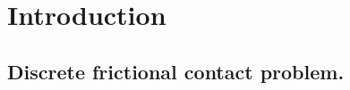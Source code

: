 
\section{Introduction}
\label{Sec:Introduction}
\subsection{Discrete frictional contact problem. }




